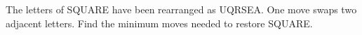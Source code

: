 The letters of SQUARE have been rearranged as UQRSEA. One move swaps two adjacent letters. Find the minimum moves needed to restore SQUARE.
